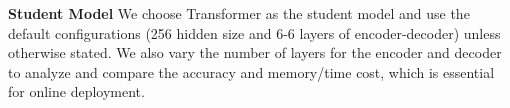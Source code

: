 \documentclass[a4paper]{article}
\begin{document}
\begin{comment}

The configurations of these models are shown in Table~\ref{tab:models}. 
\begin{table}[th]
  \caption{The configurations of the models for ensemble. The configuration variations include the position embedding (learned~\cite{devlin2018bert} or fixed~\cite{vaswani2017attention}) and the number of multi-head attention in Transformer, the hidden dimension in Bi-LSTM, and the number of layers and kernel widths in CNN.}
  \label{tab:models}
  \centering
  \begin{tabular}{cccc}
   \toprule
    \textbf{Model}                     & \textbf{Layers} &\textbf{Dims}&\textbf{Other}            \\
    \midrule
      Transformer                     &6, 6&256&16 heads, learned position             \\
      Transformer                     &6, 6&256&16 heads             \\
     Transformer                     &6, 6&256&8 heads             \\
     Transformer                     &6, 4&256&16 heads             \\
      Transformer                     &8, 4&256&16 heads             \\
      Bi-LSTM                          &1, 1&256&  /           \\
      Bi-LSTM                          &1, 1&384&  /           \\
      Bi-LSTM                          &1, 1&512&  /           \\
      CNN                     &10, 10&256&kernel width=3          \\
      CNN                     &10, 10&256&kernel width=2              \\
      CNN                     &8, 8&256&kernel width=2             \\
    \bottomrule
  \end{tabular}
  
\end{table}
\end{comment}


\textbf{Student Model} We choose Transformer as the student model and use the default configurations (256 hidden size and 6-6 layers of encoder-decoder) unless otherwise stated. We also vary the number of layers for the encoder and decoder to analyze and compare the accuracy and memory/time cost, which is essential for online deployment.
\end{document}
